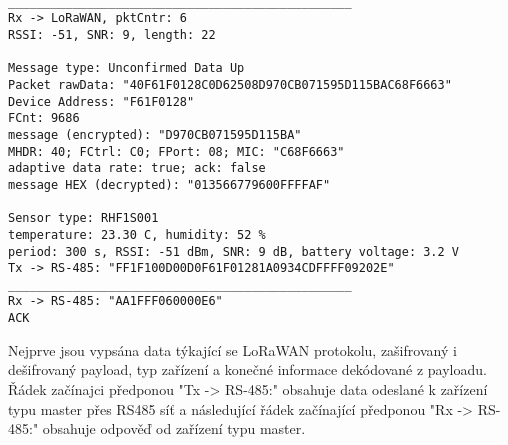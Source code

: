 \begin{lstlisting}[style=log]

________________________________________________
Rx -> LoRaWAN, pktCntr: 6
RSSI: -51, SNR: 9, length: 22

Message type: Unconfirmed Data Up
Packet rawData: "40F61F0128C0D62508D970CB071595D115BAC68F6663"
Device Address: "F61F0128"
FCnt: 9686
message (encrypted): "D970CB071595D115BA"
MHDR: 40; FCtrl: C0; FPort: 08; MIC: "C68F6663"
adaptive data rate: true; ack: false
message HEX (decrypted): "013566779600FFFFAF"

Sensor type: RHF1S001
temperature: 23.30 C, humidity: 52 %
period: 300 s, RSSI: -51 dBm, SNR: 9 dB, battery voltage: 3.2 V
Tx -> RS-485: "FF1F100D00D0F61F01281A0934CDFFFF09202E"
________________________________________________
Rx -> RS-485: "AA1FFF060000E6"
ACK
\end{lstlisting}


Nejprve jsou vypsána data týkající se LoRaWAN protokolu, zašifrovaný i dešifrovaný payload, typ zařízení a konečné informace dekódované z payloadu.
Řádek začínajci předponou "Tx -> RS-485:" obsahuje data odeslané k zařízení typu master přes RS485 síť a následující řádek začínající předponou "Rx -> RS-485:" obsahuje odpověď od zařízení typu master.



    
    
    
    
